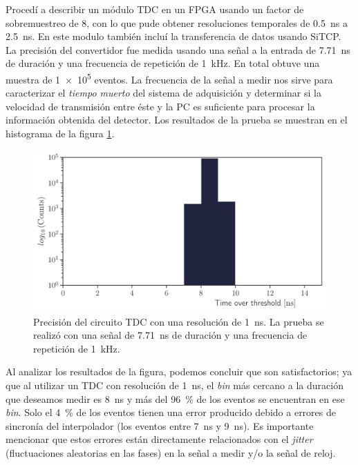 Procedí a describir un módulo TDC en un FPGA usando un factor de sobremuestreo de \num{8}, con lo que pude obtener resoluciones temporales de \SI{0.5}{\nano\second} a \SI{2.5}{\nano\second}. En este modulo también incluí la transferencia de datos usando SiTCP. La precisión del convertidor fue medida usando una señal a la entrada de \SI{7.71}{\nano\second} de duración y una frecuencia de repetición de \SI{1}{\kilo\hertz}. En total obtuve una muestra de \num{1e5} eventos. La frecuencia de la señal a medir nos sirve para caracterizar el \emph{tiempo muerto} del sistema de adquisición y determinar si la velocidad de transmisión entre éste y la PC es suficiente para procesar la información obtenida del detector. Los resultados de la prueba se muestran en el histograma de la figura \ref{fig:tdc-lvds}.

\begin{figure}
        \centering
        \includegraphics[width=\textwidth]{tot-lvds.pdf}
        \caption{Precisión del circuito TDC con una resolución de \SI{1}{\nano\second}. La prueba se realizó con una señal de \SI{7.71}{\nano\second} de duración y una frecuencia de repetición de \SI{1}{\kilo\hertz}.}
        \label{fig:tdc-lvds}
\end{figure}

Al analizar los resultados de la figura, podemos concluir que son satisfactorios; ya que al utilizar un TDC con resolución de \SI{1}{\nano\second}, el \emph{bin} más cercano a la duración que deseamos medir es \SI{8}{\nano\second} y más del \SI{96}{\percent} de los eventos se encuentran en ese \emph{bin}. Solo el \SI{4}{\percent} de los eventos tienen una error producido debido a errores de sincronía del interpolador (los eventos entre \SI{7}{\nano\second} y \SI{9}{\nano\second}). Es importante mencionar que estos errores están directamente relacionados con el \emph{jitter} (fluctuaciones aleatorias en las fases) en la señal a medir y/o la señal de reloj.

